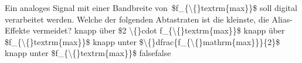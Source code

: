     {Ein analoges Signal mit einer Bandbreite von \$f\_\{\textbackslash\{\}textrm\{max\}\}\$ soll digital verarbeitet werden. Welche der folgenden Abtastraten ist die kleinste, die Alias-Effekte vermeidet?}
    {knapp über \$2 \textbackslash\{\}cdot f\_\{\textbackslash\{\}textrm\{max\}\}\$}
    {knapp über \$f\_\{\textbackslash\{\}textrm\{max\}\}\$}
    {knapp unter \$\textbackslash\{\}dfrac\{f\_\{\textbackslash\{\}mathrm\{max\}\}\}\{2\}\$}
    {knapp unter \$f\_\{\textbackslash\{\}textrm\{max\}\}\$}
    {false}{false}